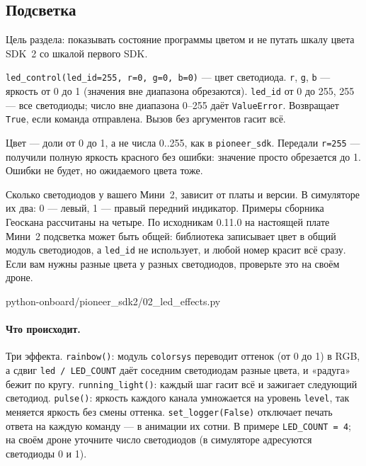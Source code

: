 \subsection{Подсветка}

Цель раздела: показывать состояние программы цветом и не путать шкалу цвета SDK~2 со шкалой первого SDK.

\begin{codebox}
\verb|led_control(led_id=255, r=0, g=0, b=0)| --- цвет светодиода. \verb|r|, \verb|g|, \verb|b| --- яркость от 0 до 1 (значения вне диапазона обрезаются). \verb|led_id| от 0 до 255, 255 --- все светодиоды; число вне диапазона 0--255 даёт \verb|ValueError|. Возвращает \verb|True|, если команда отправлена. Вызов без аргументов гасит всё.
\end{codebox}

\begin{rulebox}
Цвет --- доли от 0 до 1, а не числа 0..255, как в \texttt{pioneer\_sdk}. Передали \verb|r=255| --- получили полную яркость красного без ошибки: значение просто обрезается до 1. Ошибки не будет, но ожидаемого цвета тоже.
\end{rulebox}

Сколько светодиодов у вашего Мини~2, зависит от платы и версии. В симуляторе их два: 0 --- левый, 1 --- правый передний индикатор. Примеры сборника Геоскана рассчитаны на четыре. По исходникам 0.11.0 на настоящей плате Мини~2 подсветка может быть общей: библиотека записывает цвет в общий модуль светодиодов, а \verb|led_id| не использует, и любой номер красит всё сразу. Если вам нужны разные цвета у разных светодиодов, проверьте это на своём дроне.

\begin{codefile}[python]{python-onboard/pioneer_sdk2/02_led_effects.py}
\end{codefile}

\paragraph{Что происходит.} Три эффекта. \verb|rainbow()|: модуль \verb|colorsys| переводит оттенок (от 0 до 1) в RGB, а сдвиг \verb|led / LED_COUNT| даёт соседним светодиодам разные цвета, и «радуга» бежит по кругу. \verb|running_light()|: каждый шаг гасит всё и зажигает следующий светодиод. \verb|pulse()|: яркость каждого канала умножается на уровень \verb|level|, так меняется яркость без смены оттенка. \verb|set_logger(False)| отключает печать ответа на каждую команду --- в анимации их сотни. В примере \verb|LED_COUNT = 4|; на своём дроне уточните число светодиодов (в симуляторе адресуются светодиоды 0 и 1).

